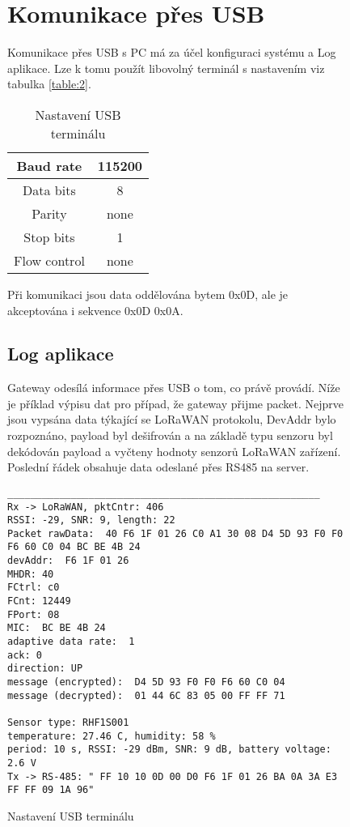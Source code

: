 \begin{figure}[!h]
\section{Komunikace přes USB}
Komunikace přes USB s PC má za účel konfiguraci systému a Log aplikace. Lze k tomu použít libovolný terminál s nastavením viz tabulka \ref{table:2}.

\begin{table}[!h]
    \centering
    \begin{tabular}{ |c|c| }
     \hline

     Baud rate              & 115200           \\ \hline
     Data bits              & 8                 \\ \hline
     Parity                 & none              \\ \hline
     Stop bits              & 1                 \\ \hline
     Flow control           & none               \\ \hline

    \end{tabular}
    \caption{Nastavení USB terminálu}
    \label{table:3}
\end{table}

Při komunikaci jsou data oddělována bytem 0x0D, ale je akceptována i sekvence 0x0D 0x0A. 

\subsection{Log aplikace}
Gateway odesílá informace přes USB o tom, co právě provádí. Níže je příklad výpisu dat pro případ, že gateway přijme packet. Nejprve jsou vypsána data týkající se LoRaWAN protokolu, DevAddr bylo rozpoznáno, payload byl dešifrován a na základě typu senzoru byl dekódován payload a vyčteny hodnoty senzorů LoRaWAN zařízení. Poslední řádek obsahuje data odeslané přes RS485 na server.


\begin{lstlisting}
______________________________________________________
Rx -> LoRaWAN, pktCntr: 406
RSSI: -29, SNR: 9, length: 22
Packet rawData:  40 F6 1F 01 26 C0 A1 30 08 D4 5D 93 F0 F0 F6 60 C0 04 BC BE 4B 24
devAddr:  F6 1F 01 26
MHDR: 40
FCtrl: c0
FCnt: 12449
FPort: 08
MIC:  BC BE 4B 24
adaptive data rate:  1
ack: 0
direction: UP
message (encrypted):  D4 5D 93 F0 F0 F6 60 C0 04
message (decrypted):  01 44 6C 83 05 00 FF FF 71

Sensor type: RHF1S001
temperature: 27.46 C, humidity: 58 %
period: 10 s, RSSI: -29 dBm, SNR: 9 dB, battery voltage: 2.6 V
Tx -> RS-485: " FF 10 10 0D 00 D0 F6 1F 01 26 BA 0A 3A E3 FF FF 09 1A 96"
\end{lstlisting}


\end{figure}
